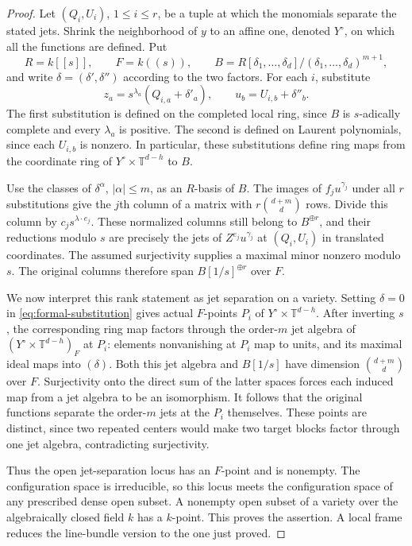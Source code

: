 \begin{proof}
Let $(Q_i,U_i)$, $1\leq i\leq r$, be a tuple at which the monomials separate the stated jets.  Shrink the neighborhood of $y$ to an affine one, denoted $Y^\circ$, on which all the functions are defined.  Put
\[
 R=k[[s]],\qquad F=k((s)),\qquad
 B=R[\delta_1,\ldots,\delta_d]/(\delta_1,\ldots,\delta_d)^{m+1},
\]
and write $\delta=(\delta',\delta'')$ according to the two factors. For each $i$, substitute
\begin{equation}\label{eq:formal-substitution}
 z_a=s^{\lambda_a}(Q_{i,a}+\delta'_a),\qquad
 u_b=U_{i,b}+\delta''_b.
\end{equation}
The first substitution is defined on the completed local ring, since $B$ is $s$-adically complete and every $\lambda_a$ is positive.  The second is defined on Laurent polynomials, since each $U_{i,b}$ is nonzero.  In particular, these substitutions define ring maps from the coordinate ring of $Y^\circ\times\mathbb{T}^{d-h}$ to $B$.

Use the classes of $\delta^\alpha$, $|\alpha|\leq m$, as an $R$-basis of $B$.  The images of $f_ju^{\gamma_j}$ under all $r$ substitutions give the $j$th column of a matrix with $r\binom{d+m}{d}$ rows.  Divide this column by $c_js^{\lambda\cdot e_j}$.  These normalized columns still belong to $B^{\oplus r}$, and their reductions modulo $s$ are precisely the jets of $Z^{e_j}u^{\gamma_j}$ at $(Q_i,U_i)$ in translated coordinates. The assumed surjectivity supplies a maximal minor nonzero modulo $s$. The original columns therefore span $B[1/s]^{\oplus r}$ over $F$.

We now interpret this rank statement as jet separation on a variety. Setting $\delta=0$ in \eqref{eq:formal-substitution} gives actual $F$-points $P_i$ of $Y^\circ\times\mathbb{T}^{d-h}$.  After inverting $s$, the corresponding ring map factors through the order-$m$ jet algebra of $(Y^\circ\times\mathbb{T}^{d-h})_F$ at $P_i$: elements nonvanishing at $P_i$ map to units, and its maximal ideal maps into $(\delta)$.  Both this jet algebra and $B[1/s]$ have dimension $\binom{d+m}{d}$ over $F$.  Surjectivity onto the direct sum of the latter spaces forces each induced map from a jet algebra to be an isomorphism.  It follows that the original functions separate the order-$m$ jets at the $P_i$ themselves.  These points are distinct, since two repeated centers would make two target blocks factor through one jet algebra, contradicting surjectivity.

Thus the open jet-separation locus has an $F$-point and is nonempty. The configuration space is irreducible, so this locus meets the configuration space of any prescribed dense open subset.  A nonempty open subset of a variety over the algebraically closed field $k$ has a $k$-point.  This proves the assertion.  A local frame reduces the line-bundle version to the one just proved.
\end{proof}

